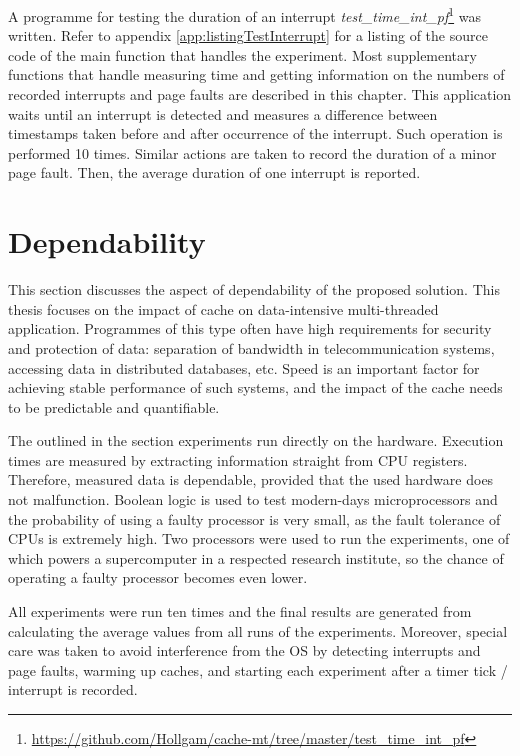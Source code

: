 A programme for testing the duration of an interrupt \textit{test\_time\_int\_pf}\footnote{\url{https://github.com/Hollgam/cache-mt/tree/master/test\_time\_int\_pf}} was written. Refer to appendix \ref{app:listingTestInterrupt} for a listing of the source code of the main function that handles the experiment. Most supplementary functions that handle measuring time and getting information on the numbers of recorded interrupts and page faults are described in this chapter. This application waits until an interrupt is detected and measures a difference between timestamps taken before and after occurrence of the interrupt. Such operation is performed 10 times. Similar actions are taken to record the duration of a minor page fault. Then, the average duration of one interrupt is reported.

\section{Dependability}
\label{dependabilitySection}

This section discusses the aspect of dependability of the proposed solution. This thesis focuses on the impact of cache on data-intensive multi-threaded application. Programmes of this type often have high requirements for security and protection of data: separation of bandwidth in telecommunication systems, accessing data in distributed databases, etc. Speed is an important factor for achieving stable performance of such systems, and the impact of the cache needs to be predictable and quantifiable.

The outlined in the section experiments run directly on the hardware. Execution times are measured by extracting information straight from CPU registers. Therefore, measured data is dependable, provided that the used hardware does not malfunction. Boolean logic is used to test modern-days microprocessors and the probability of using a faulty processor is very small, as the fault tolerance of CPUs is extremely high. Two processors were used to run the experiments, one of which powers a supercomputer in a respected research institute, so the chance of operating a faulty processor becomes even lower.

All experiments were run ten times and the final results are generated from calculating the average values from all runs of the experiments. Moreover, special care was taken to avoid interference from the OS by detecting interrupts and page faults, warming up caches, and starting each experiment after a timer tick / interrupt is recorded.

